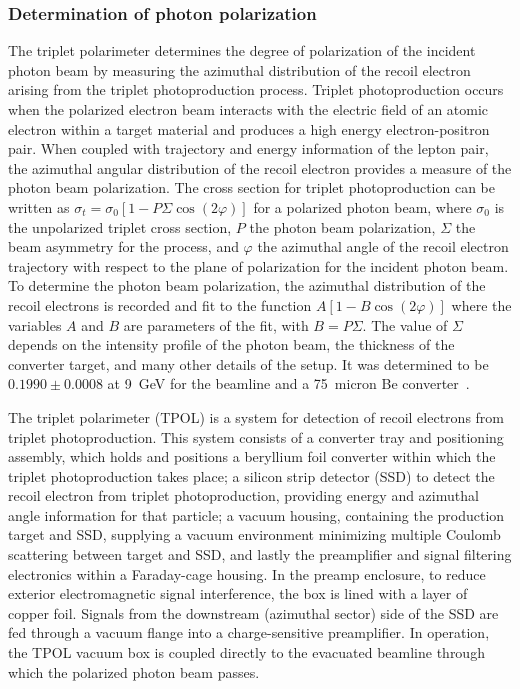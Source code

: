 \subsubsection{Determination of photon polarization \label{sec:polarization}}
The triplet polarimeter determines the degree of polarization of the
incident photon beam by measuring the azimuthal distribution of the
recoil electron arising from the triplet photoproduction process.
Triplet photoproduction occurs when the polarized electron beam interacts
with the electric field of an atomic electron within a target material
and produces a high energy electron-positron pair. When coupled with
trajectory and energy information of the lepton pair, the azimuthal
angular distribution of the recoil electron provides a measure of
the photon beam polarization. The cross section for triplet photoproduction
can be written as $\sigma_t = \sigma_0 [ 1 - P \Sigma \cos(2\varphi)]$
for a polarized photon beam, where $\sigma_0$ is the unpolarized triplet
cross section, $P$ the photon beam polarization, $\Sigma$ the beam
asymmetry for the process, and $\varphi$ the azimuthal angle of the
recoil electron trajectory with respect to the plane of polarization
for the incident photon beam. To determine the photon beam polarization,
the azimuthal distribution of the recoil electrons is recorded and fit
to the function $A [ 1- B \cos(2\varphi)]$  where the variables $A$ and
$B$ are parameters of the fit, with $B = P \Sigma$. The value of
$\Sigma$ depends on the intensity profile of the photon beam, the
thickness of the converter target, and many other details of the setup.
It was determined to be $0.1990 ± 0.0008$ at 9~GeV for the \GX{} beamline
and a 75~micron Be converter~\cite{DUGGER2017115}.

The triplet polarimeter (TPOL) is a system for detection of recoil electrons
from triplet photoproduction. This system consists of a converter tray and
positioning assembly, which holds and positions a beryllium foil converter
within which the triplet photoproduction takes place; a silicon strip detector
(SSD) to detect the recoil electron from triplet photoproduction, providing
energy and azimuthal angle information for that particle; a vacuum housing,
containing the production target and SSD, supplying a vacuum environment
minimizing multiple Coulomb scattering between target and SSD, and lastly
the preamplifier and signal filtering electronics within a Faraday-cage
housing. In the preamp enclosure, to reduce exterior electromagnetic
signal interference, the box is lined with a layer of copper foil.
Signals from the downstream (azimuthal sector) side of the SSD are
fed through a vacuum flange into a charge-sensitive preamplifier.
In operation, the TPOL vacuum box is coupled directly to the evacuated
beamline through which the polarized photon beam passes. 

